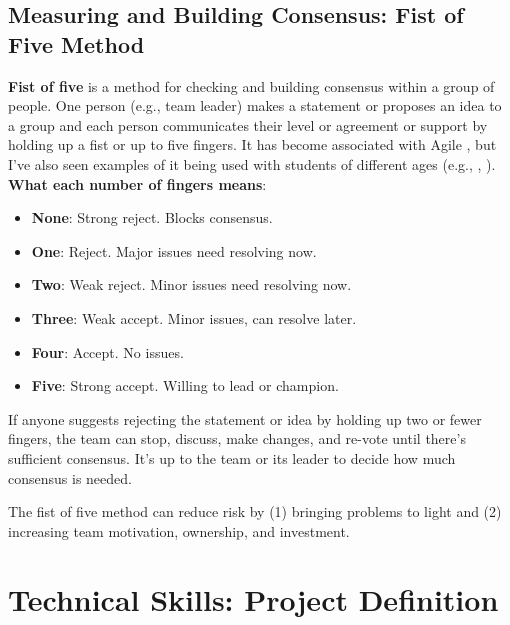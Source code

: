 \subsection{Measuring and Building Consensus: Fist of Five Method}
\textbf{Fist of five} is a method for checking and building consensus within a group of people. One person (e.g., team leader) makes a statement or proposes an idea to a group and each person communicates their level or agreement or support by holding up a fist or up to five fingers. It has become associated with Agile \parencite{belling2020agile}, but I've also seen examples of it being used with students of different ages (e.g., \parencite{fletcher2002firestarter}, \parencite{hulshult2019using}). \textbf{What each number of fingers means}:\marginpar{\fistOfFiveDef\margindivider}

\begin{itemize}
    \item \textbf{None}: Strong reject. Blocks consensus.
    \item \textbf{One}: Reject. Major issues need resolving now.
    \item \textbf{Two}: Weak reject. Minor issues need resolving now.
    \item \textbf{Three}: Weak accept. Minor issues, can resolve later.
    \item \textbf{Four}: Accept. No issues.
    \item \textbf{Five}: Strong accept. Willing to lead or champion.
\end{itemize}

If anyone suggests rejecting the statement or idea by holding up two or fewer fingers, the team can stop, discuss, make changes, and re-vote until there's sufficient consensus. It's up to the team or its leader to decide how much consensus is needed.

The fist of five method can reduce risk by (1) bringing problems to light and (2) increasing team motivation, ownership, and investment.

\section{Technical Skills: Project Definition}

